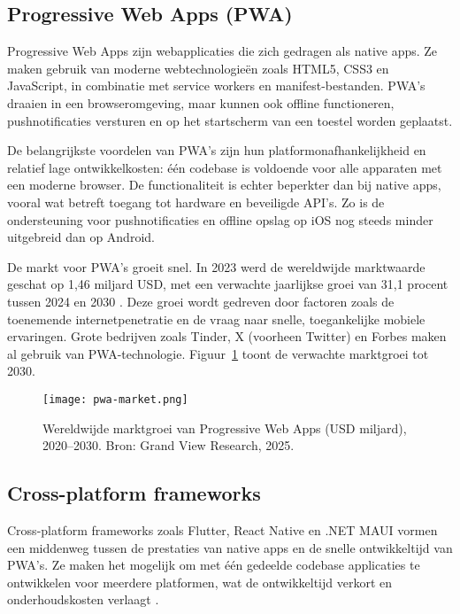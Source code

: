 \subsection{Progressive Web Apps (PWA)}
Progressive Web Apps zijn webapplicaties die zich gedragen als native apps. Ze maken gebruik van moderne webtechnologieën zoals HTML5, CSS3 en JavaScript, in combinatie met service workers en manifest-bestanden. PWA’s draaien in een browseromgeving, maar kunnen ook offline functioneren, pushnotificaties versturen en op het startscherm van een toestel worden geplaatst.

De belangrijkste voordelen van PWA’s zijn hun platformonafhankelijkheid en relatief lage ontwikkelkosten: één codebase is voldoende voor alle apparaten met een moderne browser. De functionaliteit is echter beperkter dan bij native apps, vooral wat betreft toegang tot hardware en beveiligde API’s. Zo is de ondersteuning voor pushnotificaties en offline opslag op iOS nog steeds minder uitgebreid dan op Android.

De markt voor PWA’s groeit snel. In 2023 werd de wereldwijde marktwaarde geschat op 1,46 miljard USD, met een verwachte jaarlijkse groei van 31,1 procent tussen 2024 en 2030 \autocite{Research2024}. Deze groei wordt gedreven door factoren zoals de toenemende internetpenetratie en de vraag naar snelle, toegankelijke mobiele ervaringen. Grote bedrijven zoals Tinder, X (voorheen Twitter) en Forbes maken al gebruik van PWA-technologie. Figuur~\ref{fig:pwa_market} toont de verwachte marktgroei tot 2030.

\begin{figure}[h]
    \centering
    \texttt{[image: pwa-market.png]}
    \caption{Wereldwijde marktgroei van Progressive Web Apps (USD miljard), 2020–2030. Bron: Grand View Research, 2025. \autocite{Research2024}}
    \label{fig:pwa_market}
\end{figure}

\subsection{Cross-platform frameworks}
Cross-platform frameworks zoals Flutter, React Native en .NET MAUI vormen een middenweg tussen de prestaties van native apps en de snelle ontwikkeltijd van PWA’s. Ze maken het mogelijk om met één gedeelde codebase applicaties te ontwikkelen voor meerdere platformen, wat de ontwikkeltijd verkort en onderhoudskosten verlaagt \autocite{Kuppan2024}.\\

